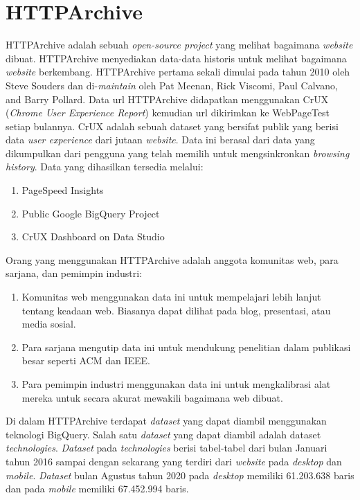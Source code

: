 \section{HTTPArchive}
HTTPArchive adalah sebuah \textit{open-source project} yang melihat bagaimana \textit{website} dibuat. HTTPArchive menyediakan data-data historis untuk melihat bagaimana \textit{website} berkembang. HTTPArchive pertama sekali dimulai pada tahun 2010 oleh Steve Souders dan di-\textit{maintain} oleh Pat Meenan, Rick Viscomi, Paul Calvano, and Barry Pollard. Data url HTTPArchive didapatkan menggunakan CrUX (\textit{Chrome User Experience Report}) kemudian url dikirimkan ke WebPageTest setiap bulannya\cite{httparchiveAbout}.
CrUX adalah sebuah dataset yang bersifat publik yang berisi data \textit{user experience} dari jutaan \textit{website}. Data ini berasal dari data yang dikumpulkan dari pengguna yang telah memilih untuk mengsinkronkan \textit{browsing history}. Data yang dihasilkan tersedia melalui:
\begin{enumerate}
	\item PageSpeed Insights
	\item Public Google BigQuery Project
	\item CrUX Dashboard on Data Studio 
\end{enumerate} 
Orang yang menggunakan HTTPArchive adalah anggota komunitas web, para sarjana, dan pemimpin industri:
\begin{enumerate}
    \item Komunitas web menggunakan data ini untuk mempelajari lebih lanjut tentang keadaan web. Biasanya dapat dilihat pada blog, presentasi, atau media sosial. 
    \item Para sarjana mengutip data ini untuk mendukung penelitian dalam publikasi besar seperti ACM dan IEEE.
    \item Para pemimpin industri menggunakan data ini untuk mengkalibrasi alat mereka untuk secara akurat mewakili bagaimana web dibuat.
\end{enumerate}
Di dalam HTTPArchive terdapat \textit{dataset} yang dapat diambil menggunakan teknologi BigQuery. Salah satu \textit{dataset} yang dapat diambil adalah dataset \textit{technologies}.
	\textit{Dataset} pada \textit{technologies} berisi tabel-tabel dari bulan Januari tahun 2016 sampai dengan sekarang yang terdiri dari \textit{website} pada \textit{desktop} dan \textit{mobile}. \textit{Dataset} bulan Agustus tahun 2020 pada \textit{desktop} memiliki 61.203.638 baris 
	 dan pada \textit{mobile} memiliki 67.452.994 baris. 



